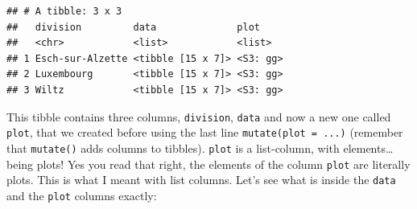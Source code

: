 \documentclass[]{gitbook}
\newenvironment{Shaded}{\begin{snugshade}}{\end{snugshade}}
\newcommand{\KeywordTok}[1]{\textcolor[rgb]{0.13,0.29,0.53}{\textbf{#1}}}
\newcommand{\NormalTok}[1]{#1}
\newcommand{\OperatorTok}[1]{\textcolor[rgb]{0.81,0.36,0.00}{\textbf{#1}}}
\newcommand{\StringTok}[1]{\textcolor[rgb]{0.31,0.60,0.02}{#1}}
\theoremstyle{definition}
\theoremstyle{definition}
\theoremstyle{definition}
\theoremstyle{remark}
\begin{document}
\begin{verbatim}
## # A tibble: 3 x 3
##   division         data              plot    
##   <chr>            <list>            <list>  
## 1 Esch-sur-Alzette <tibble [15 x 7]> <S3: gg>
## 2 Luxembourg       <tibble [15 x 7]> <S3: gg>
## 3 Wiltz            <tibble [15 x 7]> <S3: gg>
\end{verbatim}

This tibble contains three columns, \texttt{division}, \texttt{data} and
now a new one called \texttt{plot}, that we created before using the
last line \texttt{mutate(plot\ =\ ...)} (remember that \texttt{mutate()}
adds columns to tibbles). \texttt{plot} is a list-column, with
elements\ldots{} being plots! Yes you read that right, the elements of
the column \texttt{plot} are literally plots. This is what I meant with
list columns. Let's see what is inside the \texttt{data} and the
\texttt{plot} columns exactly:

\begin{Shaded}
\end{Shaded}
\end{document}
